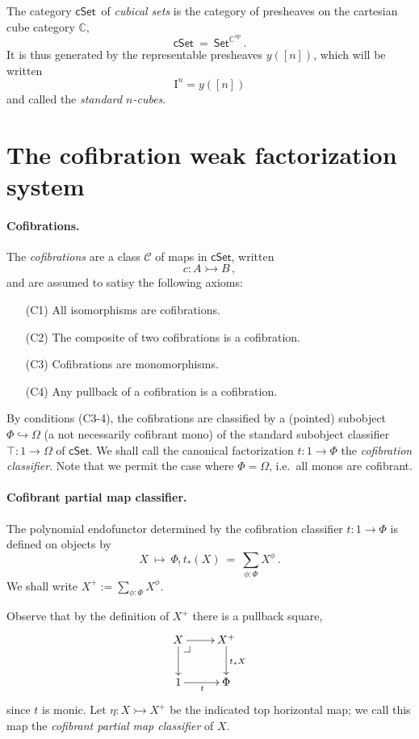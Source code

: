 \documentclass[11pt]{article}
\makeatletter
\newcommand{\C}{\ensuremath{\mathbb{C}}}
\newcommand{\psh}[1]{\ensuremath{\mathsf{Set}^{#1^{\mathrm{op}}}}}
\newcommand{\cSet}{\ensuremath{\mathsf{cSet}}}
\newcommand{\pbcorner}[1][dr]{\save*!/#1-1.2pc/#1:(-1,1)@^{|-}\restore}
\newcommand{\hook}{\ensuremath{\hookrightarrow}}
\newcommand{\mono}{\ensuremath{\rightarrowtail}}
\newcommand{\I}{\ensuremath{\mathrm{I}}}
\theoremstyle{remark}
\theoremstyle{definition}
\makeatother
\begin{document}
The category \cSet\ of \emph{cubical sets} is the category of presheaves on the cartesian cube category $\C$,
\[
\mathsf{cSet}\ =\ \psh{\C}\,.
\]
It is thus generated by the representable presheaves $y([n])$, which will be written $$\I^n = y([n])$$
and called the \emph{standard $n$-cubes}.  

\section{The cofibration weak factorization system}

\paragraph{Cofibrations.}
The \emph{cofibrations} are a class $\mathcal{C}$ of maps in $\mathsf{cSet}$, written $$c : A \mono B\,,$$  
and are assumed to satisy the following axioms:
\begin{enumerate}
\item[(C1)] All isomorphisms are cofibrations.
\item[(C2)] The composite of two cofibrations is a cofibration.
\item[(C3)] Cofibrations are monomorphisms.
\item[(C4)] Any pullback of a cofibration is a cofibration.
\end{enumerate}

By conditions (C3-4), the cofibrations are classified by a (pointed) subobject $\Phi \hook \Omega$ (a not necessarily cofibrant mono) of the standard subobject classifier $\top : 1 \to \Omega$ of $\mathsf{cSet}$. We shall call the canonical factorization $t : 1 \to \Phi$ the \emph{cofibration classifier}.  Note that we permit the case where $\Phi = \Omega$, i.e.\ all monos are cofibrant.

\paragraph{Cofibrant partial map classifier.}
The polynomial endofunctor \cite{GG} determined by the cofibration classifier $t : 1 \to \Phi$ is defined on objects by
\[
X\ \mapsto\ \Phi_!\,t_*(X)\ =\ \sum_{\phi: \Phi}X^{\phi}\,.
\]
We shall write $X^+ := \sum_{\phi: \Phi}X^{\phi}$.

Observe that by the definition of $X^+$ there is a pullback square,
\[
\xymatrix{
X \ar[d]\pbcorner \ar[r] & X^+ \ar[d]^{t_*X}\\
1 \ar[r]_{t} & \Phi
}
\]
since $t$ is monic. Let $\eta : X\mono X^+$ be the indicated top horizontal map; we call this map the \emph{cofibrant partial map classifier} of $X$.
 
\end{document}
